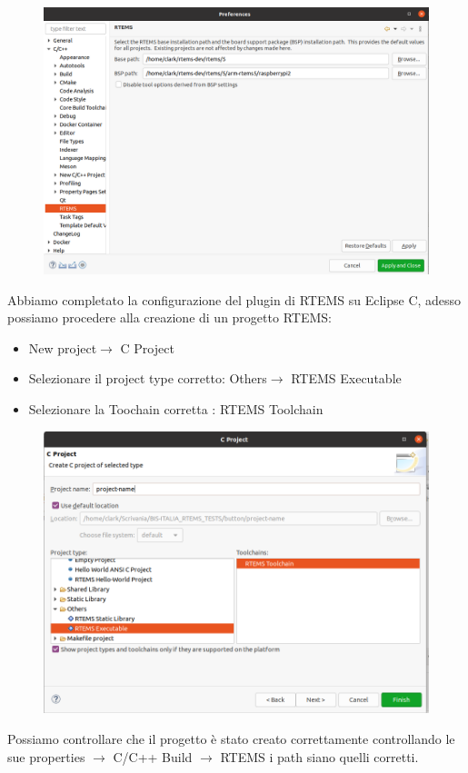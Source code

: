 \documentclass[12pt, a4paper]{article}
\begin{document}
\begin{flushleft}
\begin{figure}[h]
\includegraphics[width=\linewidth]{rtems-path-eclipse.png}
\end{figure}

\newpage

Abbiamo completato la configurazione del plugin di RTEMS su Eclipse C, adesso possiamo procedere alla creazione di un progetto RTEMS:
\begin{itemize}
\item New project$\rightarrow$ C Project
\item Selezionare il project type corretto: Others$\rightarrow$ RTEMS Executable
\item Selezionare la Toochain corretta : RTEMS Toolchain
\end{itemize}
\begin{figure}[h!]
\includegraphics[width=\linewidth]{new-c-project.png}
\end{figure}
Possiamo controllare che il progetto è stato creato correttamente controllando le sue properties $\rightarrow$ C/C++ Build $\rightarrow$ RTEMS i path siano quelli corretti.


\end{flushleft}
\end{document}
